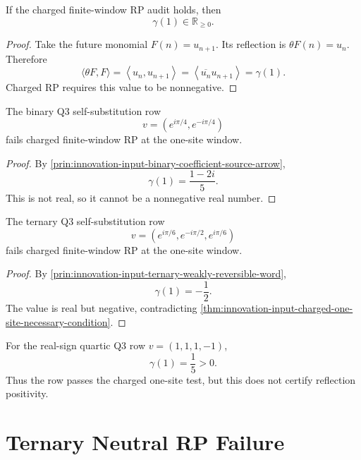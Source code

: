 \begin{theorem}
\label{thm:innovation-input-charged-one-site-necessary-condition}
If the charged finite-window RP audit holds, then
$$
\gamma(1)\in\mathbb R_{\ge0}.
$$
\end{theorem}

\begin{proof}
Take the future monomial $F(n)=u_{n+1}$. Its reflection is
$\theta F(n)=u_n$. Therefore
$$
\langle\theta F,F\rangle
=
\left\langle u_n,u_{n+1}\right\rangle
=
\left\langle \overline{u_n}u_{n+1}\right\rangle
=
\gamma(1).
$$
Charged RP requires this value to be nonnegative.
\end{proof}

\begin{corollary}
\label{cor:innovation-input-binary-charged-rp-obstruction}
The binary Q3 self-substitution row
$$
v=(e^{i\pi/4},e^{-i\pi/4})
$$
fails charged finite-window RP at the one-site window.
\end{corollary}

\begin{proof}
By \autoref{prin:innovation-input-binary-coefficient-source-arrow},
$$
\gamma(1)=\frac{1-2i}{5}.
$$
This is not real, so it cannot be a nonnegative real number.
\end{proof}

\begin{corollary}
\label{cor:innovation-input-ternary-charged-rp-obstruction}
The ternary Q3 self-substitution row
$$
v=(e^{i\pi/6},e^{-i\pi/2},e^{i\pi/6})
$$
fails charged finite-window RP at the one-site window.
\end{corollary}

\begin{proof}
By \autoref{prin:innovation-input-ternary-weakly-reversible-word},
$$
\gamma(1)=-\frac12.
$$
The value is real but negative, contradicting
\autoref{thm:innovation-input-charged-one-site-necessary-condition}.
\end{proof}

\begin{principle}
\label{prin:innovation-input-quartic-one-site-survival}
For the real-sign quartic Q3 row $v=(1,1,1,-1)$,
$$
\gamma(1)=\frac15>0.
$$
Thus the row passes the charged one-site test, but this does not certify
reflection positivity.
\end{principle}

\section{Ternary Neutral RP Failure}
\label{sec:innovation-input-ternary-neutral-rp-failure}

